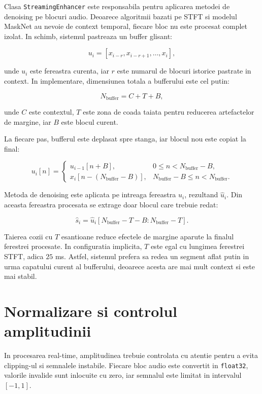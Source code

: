 Clasa \texttt{StreamingEnhancer} este responsabila pentru aplicarea metodei de
denoising pe blocuri audio. Deoarece algoritmii bazati pe STFT si modelul
MaskNet au nevoie de context temporal, fiecare bloc nu este procesat complet
izolat. In schimb, sistemul pastreaza un buffer glisant:

\[
u_i =
[x_{i-r}, x_{i-r+1}, \ldots, x_i],
\]

unde \(u_i\) este fereastra curenta, iar \(r\) este numarul de blocuri istorice
pastrate in context. In implementare, dimensiunea totala a bufferului este cel
putin:

\[
N_{\text{buffer}} = C + T + B,
\]

unde \(C\) este contextul, \(T\) este zona de coada taiata pentru reducerea
artefactelor de margine, iar \(B\) este blocul curent.

La fiecare pas, bufferul este deplasat spre stanga, iar blocul nou este copiat
la final:

\[
u_i[n] =
\begin{cases}
u_{i-1}[n+B], & 0 \leq n < N_{\text{buffer}} - B, \\
x_i[n - (N_{\text{buffer}} - B)], & N_{\text{buffer}} - B \leq n < N_{\text{buffer}}.
\end{cases}
\]

Metoda de denoising este aplicata pe intreaga fereastra \(u_i\), rezultand
\(\hat{u}_i\). Din aceasta fereastra procesata se extrage doar blocul care
trebuie redat:

\[
\hat{s}_i =
\hat{u}_i[N_{\text{buffer}} - T - B : N_{\text{buffer}} - T].
\]

Taierea cozii cu \(T\) esantioane reduce efectele de margine aparute la finalul
ferestrei procesate. In configuratia implicita, \(T\) este egal cu lungimea
ferestrei STFT, adica \(25\) ms. Astfel, sistemul prefera sa redea un segment
aflat putin in urma capatului curent al bufferului, deoarece acesta are mai mult
context si este mai stabil.

\section{Normalizare si controlul amplitudinii}

In procesarea real-time, amplitudinea trebuie controlata cu atentie pentru a
evita clipping-ul si semnalele instabile. Fiecare bloc audio este convertit in
\texttt{float32}, valorile invalide sunt inlocuite cu zero, iar semnalul este
limitat in intervalul \([-1, 1]\).

